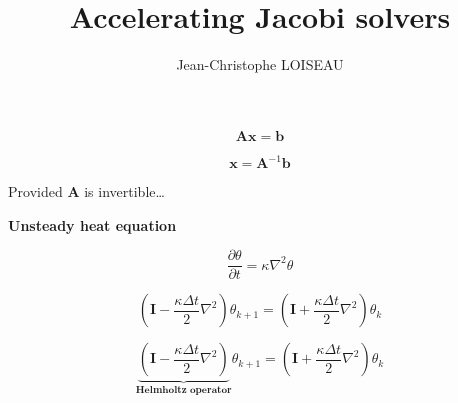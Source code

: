 \documentclass[aspectratio=169]{beamer}
\title{Accelerating Jacobi solvers}
\author{Jean-Christophe LOISEAU}
\institute{Arts \& Métiers Institute of Technology, January 2022}
\date{}
\begin{document}
\frame{\titlepage}





\begin{frame}

  \begin{overprint}
    \huge
    \[
    \bm{Ax} = \bm{b}
    \]

    \huge
    \[
    \bm{x} = \bm{A}^{-1} \bm{b}
    \]

    \bigskip

    \flushright
    \small
    Provided $\bm{A}$ is invertible\ldots
  \end{overprint}
  \vspace{-1cm}
\end{frame}

{
  \frame{
    \vfill
    \centering
    \vfill
  }
}

\begin{frame}
  \centering
  \textbf{Unsteady heat equation}
  
  \medskip
  
  \begin{overprint}
    \large
    \[
    \dfrac{\partial \theta}{\partial t} = \kappa \nabla^2 \theta
    \]
    
    \large
    \[
    \left( \bm{I} - \dfrac{\kappa \Delta t}{2} \nabla^2 \right) \theta_{k+1} = \left( \bm{I} + \dfrac{\kappa \Delta t}{2} \nabla^2 \right) \theta_k
    \]
    
    
    \[
    \underbrace{
      \left( \bm{I} - \dfrac{\kappa \Delta t}{2} \nabla^2 \right)}_{\textbf{Helmholtz operator}}
    \theta_{k+1} = \left( \bm{I} + \dfrac{\kappa \Delta t}{2} \nabla^2 \right) \theta_k
    \]
  \end{overprint}
  
  \vspace{-1cm}
\end{frame}

{
  \begin{frame}[plain]
  \end{frame}
}
\end{document}
